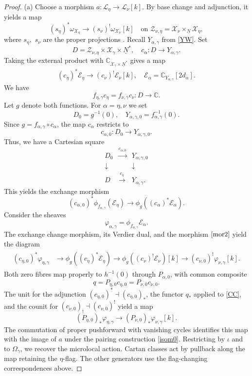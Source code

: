 \documentclass[11pt,reqno]{amsart}
\theoremstyle{definition}
\theoremstyle{remark}
\def\bbC{\mathbb C}
\def\dN{\underline N}
\def\scrX{\mathscr X}
\def\scrZ{\mathscr Z}
\def\calE{\mathcal E}
\begin{document}
\begin{proof}
(a) 
Choose a morphism $a:\mathscr L_\eta\to\mathscr L_\nu[k]$. 
By base change and adjunction, it yields a map
\[
 (s_\eta)^*\omega_{\scrX_\eta}
 \longrightarrow (s_\nu)^!\omega_{\scrX_\nu}[k]
 \quad\text{on }\scrZ_{\nu,\eta}=\scrX_\nu\times_{\dN}\scrX_\eta,
\]
where $s_\eta,$ $s_\nu$ are the proper projections \cite[\S8.6]{CG97}. 
Recall $Y_{\alpha,\gamma}$ from \eqref{YW}. Set
$$D=\scrZ_{\nu,\eta}\times\scrX_\gamma\times\dN^*
,\quad
c_\alpha:D\to Y_{\alpha,\gamma}.$$
Taking the external product with
$\bbC_{\scrX_\gamma\times\dN^*}$ gives a map
\begin{align}\label{mor2}
 (c_\eta)^*\calE_\eta\longrightarrow (c_\nu)^!\calE_\nu[k],
 \quad\calE_\alpha=\bbC_{Y_{\alpha,\gamma}}[2d_\alpha].
\end{align}
We have
$$f_{\eta,\gamma}c_\eta=f_{\nu,\gamma}c_\nu:D\longrightarrow\mathbb C.$$
Let $g$ denote both functions.
For \(\alpha=\eta,\nu\) we set
$$D_0=g^{-1}(0)
,\quad
Y_{\alpha,\gamma,0}=f_{\alpha,\gamma}^{-1}(0).$$ 
Since \(g=f_{\alpha,\gamma}\circ c_\alpha\), the map \(c_\alpha\) restricts to
\[
c_{\alpha,0}:D_0\longrightarrow Y_{\alpha,\gamma,0}.
\]
Thus, we have a Cartesian square
\[
\begin{array}{ccc}
D_0&\xrightarrow{c_{\alpha,0}}&
Y_{\alpha,\gamma,0}\\
\downarrow&&\downarrow\\
D&\xrightarrow{c_\eta}&Y_{\alpha,\gamma}.
\end{array}
\]
This yields the exchange morphism
\[
(c_{\alpha,0})^{*}\phi_{f_{\alpha,\gamma}}(\mathcal E_\eta)
\longrightarrow
\phi_g((c_\alpha)^{*}\mathcal E_\alpha).
\]
Consider the sheaves
$$\varphi_{\alpha,\gamma}=\phi_{f_{\alpha,\gamma}}\calE_\alpha.$$
The exchange change morphism, its Verdier dual, 
and the morphism \(\eqref{mor2}\) yield the diagram
\begin{align}\label{CC}
 \begin{split}
 (c_{\eta,0})^*\varphi_{\eta,\gamma}
 &\longrightarrow\phi_g((c_\eta)^*\calE_\eta)
 \longrightarrow\phi_g((c_\nu)^!\calE_\nu)[k]
 \longrightarrow (c_{\nu,0})^!\varphi_{\nu,\gamma}[k].
 \end{split}
\end{align}
Both zero fibres map properly to $h^{-1}(0)$ through $P_{\alpha,0}$,
with common composite $$q=P_{\eta,0}c_{\eta,0}=P_{\nu,0}c_{\nu,0}.$$
The unit for the adjunction $(c_{\eta,0})^*\dashv(c_{\eta,0})_*$,
the functor $q_*$ applied to \eqref{CC}, and the counit for
$(c_{\nu,0})_!\dashv (c_{\nu,0})^!$ yield a map
\[
 (P_{\eta,0})_*\varphi_{\eta,\gamma}
 \longrightarrow(P_{\nu,0})_*\varphi_{\nu,\gamma}[k].
\]
The commutation of proper pushforward with vanishing cycles identifies
this map with the image of $a$ under the pairing construction
\eqref{isom0}. Restricting by $\iota$ and to $\Omega_\gamma$, we recover the microlocal action. 
Cartan classes act by pullback along
the map retaining the $\eta$-flag.
The other generators use the
flag-changing correspondences above.


\end{proof}
\end{document}
